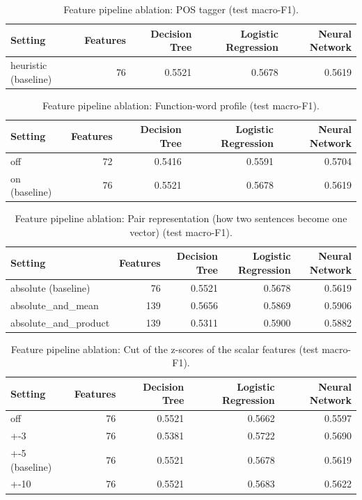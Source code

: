 \begin{table}[ht]
\centering
\small
\caption{Feature pipeline ablation: POS tagger (test macro-F1).}
\label{tab:pipeline-pos-tagger}
\begin{tabular}{lrrrr}
\toprule
Setting & Features & Decision Tree & Logistic Regression & Neural Network \\
\midrule
heuristic (baseline) & 76 & 0.5521 & 0.5678 & 0.5619 \\
\bottomrule
\end{tabular}
\end{table}

\begin{table}[ht]
\centering
\small
\caption{Feature pipeline ablation: Function-word profile (test macro-F1).}
\label{tab:pipeline-function-words}
\begin{tabular}{lrrrr}
\toprule
Setting & Features & Decision Tree & Logistic Regression & Neural Network \\
\midrule
off & 72 & 0.5416 & 0.5591 & 0.5704 \\
on (baseline) & 76 & 0.5521 & 0.5678 & 0.5619 \\
\bottomrule
\end{tabular}
\end{table}

\begin{table}[ht]
\centering
\small
\caption{Feature pipeline ablation: Pair representation (how two sentences become one vector) (test macro-F1).}
\label{tab:pipeline-pair-representation}
\begin{tabular}{lrrrr}
\toprule
Setting & Features & Decision Tree & Logistic Regression & Neural Network \\
\midrule
absolute (baseline) & 76 & 0.5521 & 0.5678 & 0.5619 \\
absolute\_and\_mean & 139 & 0.5656 & 0.5869 & 0.5906 \\
absolute\_and\_product & 139 & 0.5311 & 0.5900 & 0.5882 \\
\bottomrule
\end{tabular}
\end{table}

\begin{table}[ht]
\centering
\small
\caption{Feature pipeline ablation: Cut of the z-scores of the scalar features (test macro-F1).}
\label{tab:pipeline-z-clip}
\begin{tabular}{lrrrr}
\toprule
Setting & Features & Decision Tree & Logistic Regression & Neural Network \\
\midrule
off & 76 & 0.5521 & 0.5662 & 0.5597 \\
+-3 & 76 & 0.5381 & 0.5722 & 0.5690 \\
+-5 (baseline) & 76 & 0.5521 & 0.5678 & 0.5619 \\
+-10 & 76 & 0.5521 & 0.5683 & 0.5622 \\
\bottomrule
\end{tabular}
\end{table}

